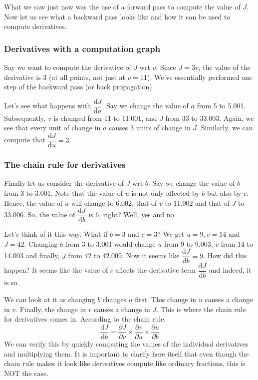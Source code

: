 \documentclass{article}[a4paper,12pt]
\theoremstyle{definition}
\begin{document}
What we saw just now was the use of a forward pass to compute the value of $J$. Now let us see what a backward pass looks like and how it can be used to compute derivatives.
\subsubsection{Derivatives with a computation graph}
Say we want to compute the derivative of $J$ wrt $v$. Since $J=3v$, the value of the derivative is 3 (at all points, not just at $v=11$). We've essentially performed one step of the backward pass (or back propagation).
\vspace{12pt}

Let's see what happens with $\dfrac{\text{d}J}{\text{d}a}$. Say we change the value of $a$ from 5 to 5.001. Subsequently, $v$ is changed from 11 to 11.001, and $J$ from 33 to 33.003. Again, we see that every unit of change in $a$ causes 3 units of change in $J$. Similarly, we can compute that $\dfrac{\text{d}J}{\text{d}u}=3$.
\subsubsection{The chain rule for derivatives}
Finally let us consider the derivative of $J$ wrt $b$. Say we change the value of $b$ from 3 to 3.001. Note that the value of $u$ is not only affected by $b$ but also by $c$. Hence, the value of $u$ will change to 6.002, that of $v$ to 11.002 and that of $J$ to 33.006. So, the value of $\dfrac{\text{d}J}{\text{d}b}$ is 6, right? Well, yes and no.
\vspace{12pt}

Let's think of it this way. What if $b=3$ and $c=3$? We get $u=9, v=14$ and $J=42$. Changing $b$ from 3 to 3.001 would change $u$ from 9 to 9.003, $v$ from 14 to 14.003 and finally, $J$ from 42 to 42.009. Now it seems like $\dfrac{\text{d}J}{\text{d}b}=9$. How did this happen? It seems like the value of $c$ affects the derivative term $\dfrac{\text{d}J}{\text{d}b}$ and indeed, it is so.
\vspace{12pt}

We can look at it as changing $b$ changes $u$ first. This change in $u$ causes a change in $v$. Finally, the change in $v$ causes a change in $J$. This is where the chain rule for derivatives comes in. According to the chain rule, $$\frac{\text{d}J}{\text{d}b}=\frac{\partial J}{\partial v}\times\frac{\partial v}{\partial u}\times\frac{\partial u}{\partial b}$$
We can verify this by quickly computing the values of the individual derivatives and multiplying them. It is important to clarify here itself that even though the chain rule makes it look like derivatives compute like ordinary fractions, this is NOT the case.
\vspace{6pt}
\end{document}
